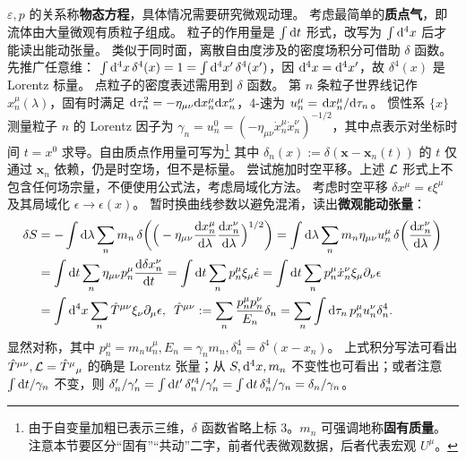 $\varepsilon,p$ 的关系称\textbf{物态方程}，具体情况需要研究微观动理。
考虑最简单的\textbf{质点气}，即流体由大量微观有质粒子组成。
粒子的作用量是 $\int\dd t$ 形式，改写为 $\int \dd[4]x$ 后才能读出能动张量。
类似于同时面，离散自由度涉及的密度场积分可借助 $\delta$ 函数。
先推广任意维：
$\int\dd[4]{x}\delta^4(x)=1=\int\dd[4]{x'}\delta^4(x')$，因 $\dd[4]{x}=\dd[4]{x'}$，故 $\delta^4(x)$ 是 Lorentz 标量。
点粒子的密度表述需用到 $\delta$ 函数。
第 $n$ 条粒子世界线记作 $x_n^\mu(\lambda)$，固有时满足 $\dd\tau_n^2=-\eta_{\mu\nu}\dd x^\mu_n\dd x^\nu_n$，4-速为 $u_n^\mu=\dv*{x_n^\mu}{\tau_n}$。
惯性系 $\{x\}$ 测量粒子 $n$ 的 Lorentz 因子为 $\gamma_n=u_n^0=(-\eta_{\mu\nu}\dot x^\mu_n\dot x^\nu_n)^{-1/2}$，其中点表示对坐标时间 $t=x^0$ 求导。自由质点作用量可写为\footnote{由于自变量加粗已表示三维，$\delta$ 函数省略上标 3。$m_n$ 可强调地称\textbf{固有质量}。
注意本节要区分“固有”“共动”二字，前者代表微观数据，后者代表宏观 $U^\mu$。
}
其中 $\delta_n(x):=\delta(\bm x-\bm x_n(t))$ 的 $t$ 仅通过 $\bm x_n$ 依赖，仍是时空场，但不是标量。
尝试施加时空平移。上述 $\mathcal{L}$ 形式上不包含任何场宗量，不便使用公式法，考虑局域化方法。
考虑时空平移 $\delta x^\mu=\epsilon\xi^\mu$ 及其局域化 $\epsilon\to\epsilon(x)$。
暂时换曲线参数以避免混淆，读出\textbf{微观能动张量}：
\begin{align}
    \delta S &= -\int\dd{\lambda}\sum_n m_n \var(\Big(-\eta_{\mu\nu}\dv{x^\mu_n}{\lambda}\dv{x^\nu_n}{\lambda}\Big)^{1/2}) = \int\dd{\lambda}\sum_n m_n \eta_{\mu\nu}u^\mu_n\var(\dv{x^\nu_n}{\lambda}) \notag\\
    &= \int\dd{t}\sum_n \eta_{\mu\nu}p^\mu_n\dv{\var x^\nu_n}{t} = \int\dd{t}\sum_n p^\mu_n \xi_\mu\dot\epsilon = \int\dd{t}\sum_n p^\mu_n \dot x^\nu_n \xi_\mu\partial_\nu\epsilon \notag\\
    &= \int\dd[4]x\sum_n \hat T^{\mu\nu} \xi_\nu\partial_\mu\epsilon,\enskip \hat T^{\mu\nu} := \sum_n \frac{p^\mu_n p^\nu_n}{E_n} \delta_n = \sum_n\int\dd{\tau_n} p^\mu_n u^\nu_n\delta^4_n.
\end{align}
显然对称，其中 $p^\mu_n=m_n u^\mu_n, E_n=\gamma_n m_n, \delta^4_n = \delta^4(x-x_n)$。
上式积分写法可看出 $\hat T^{\mu\nu},\mathcal{L} = \hat T^\mu{}_\mu$ 的确是 Lorentz 张量；从 $S,\dd[4]x,m_n$ 不变性也可看出；或者注意 $\int\dd t/\gamma_n$ 不变，则 $\delta'_n/\gamma'_n = \int\dd{t'}\delta'^4_n/\gamma'_n = \int\dd {t}\delta^4_n/\gamma_n=\delta_n/\gamma_n$。
